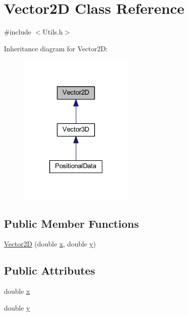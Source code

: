 \hypertarget{class_vector2_d}{}\section{Vector2D Class Reference}
\label{class_vector2_d}


{\ttfamily \#include $<$Utils.\+h$>$}



Inheritance diagram for Vector2D\+:\nopagebreak
\begin{figure}[H]
\begin{center}
\leavevmode
\includegraphics[width=160pt]{class_vector2_d__inherit__graph}
\end{center}
\end{figure}
\subsection*{Public Member Functions}
\begin{DoxyCompactItemize}
\item 
\hyperlink{class_vector2_d_a525e125aac4c844f04c52ddb0e75d594}{Vector2D} (double \hyperlink{class_vector2_d_ac5c4e553815737aa24bec8281270178f}{x}, double \hyperlink{class_vector2_d_ac38d0179cfe74c30fee290a703ab209a}{y})
\end{DoxyCompactItemize}
\subsection*{Public Attributes}
\begin{DoxyCompactItemize}
\item 
double \hyperlink{class_vector2_d_ac5c4e553815737aa24bec8281270178f}{x}
\item 
double \hyperlink{class_vector2_d_ac38d0179cfe74c30fee290a703ab209a}{y}
\end{DoxyCompactItemize}


